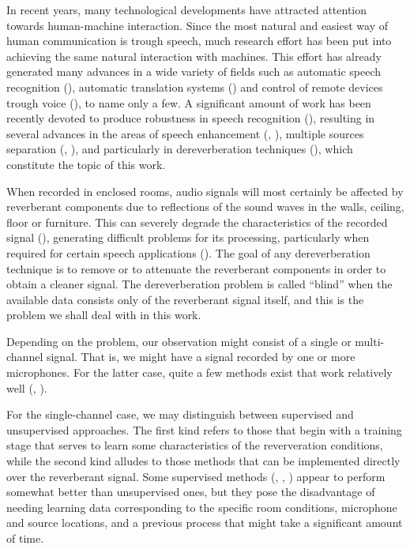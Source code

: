 \documentclass[12pt]{article}
\begin{document}
In recent years, many technological developments have attracted attention towards human-machine interaction. Since the most natural and easiest way of human communication is trough speech, much research effort has been put into achieving the same natural interaction with machines. This effort has already generated many advances in a wide variety of fields such as automatic speech recognition (\cite{kim_efficient_2015}), automatic translation systems (\cite{yun_multilingual_2014}) and control of remote devices trough voice (\cite{nesselrath2016combining}), to name only a few. A significant amount of work has been recently devoted to produce robustness in speech recognition (\cite{DMR+2008}), resulting in several advances in the areas of speech enhancement (\cite{kim_efficient_2015}, \cite{martinez_denoising_2015}), multiple sources separation (\cite{DMY2009a}, \cite{di_persia_using_2016}), and particularly in dereverberation techniques (\cite{tsilfidis2010}), which constitute the topic of this work.

When  recorded in enclosed rooms, audio signals will most certainly be affected by reverberant components due to reflections of the sound waves in the walls, ceiling, floor or furniture. This can severely degrade the characteristics of the recorded signal (\cite{tashev2009}), generating difficult problems for its processing, particularly when required for certain speech applications (\cite{huang2001}). The goal of any dereverberation technique is to remove or to attenuate the reverberant components in order to obtain a cleaner signal. The dereverberation problem is called ``blind'' when the available data consists only of the reverberant signal itself, and this is the problem we shall deal with in this work.

Depending on the problem, our observation might consist of a single or multi-channel signal. That is, we might have a signal recorded by one or more microphones. For the latter case, quite a few methods exist that work relatively well (\cite{delcroix2014}, \cite{wisdom2014}).

For the single-channel case, we may distinguish between supervised and unsupervised approaches. The first kind refers to those that begin with a training stage that serves to learn some characteristics of the reververation conditions, while the second kind alludes to those methods that can be implemented directly over the reverberant signal. Some supervised methods (\cite{moshirynia2014}, \cite{xiao2014}, \cite{nathwani2015}) appear to perform somewhat better than unsupervised ones, but they pose the disadvantage of needing learning data corresponding to the specific room conditions, microphone and source locations, and a previous process that might take a significant amount of time.
\end{document}
